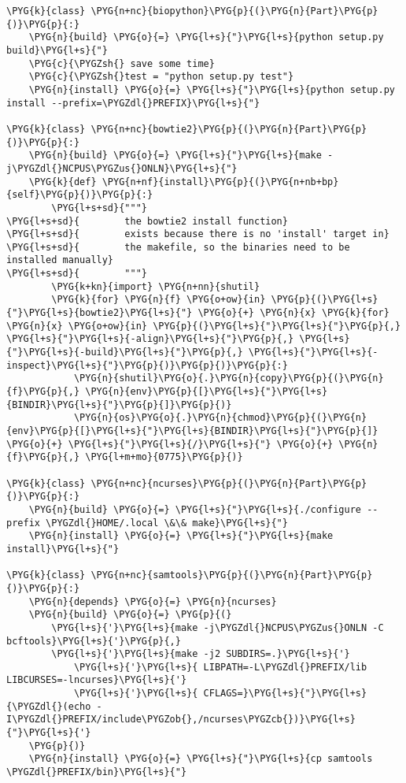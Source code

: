 \begin{Verbatim}[commandchars=\\\{\}]
\PYG{k}{class} \PYG{n+nc}{biopython}\PYG{p}{(}\PYG{n}{Part}\PYG{p}{)}\PYG{p}{:}
    \PYG{n}{build} \PYG{o}{=} \PYG{l+s}{"}\PYG{l+s}{python setup.py build}\PYG{l+s}{"}
    \PYG{c}{\PYGZsh{} save some time}
    \PYG{c}{\PYGZsh{}test = "python setup.py test"}
    \PYG{n}{install} \PYG{o}{=} \PYG{l+s}{"}\PYG{l+s}{python setup.py install --prefix=\PYGZdl{}PREFIX}\PYG{l+s}{"}

\PYG{k}{class} \PYG{n+nc}{bowtie2}\PYG{p}{(}\PYG{n}{Part}\PYG{p}{)}\PYG{p}{:}
    \PYG{n}{build} \PYG{o}{=} \PYG{l+s}{"}\PYG{l+s}{make -j\PYGZdl{}NCPUS\PYGZus{}ONLN}\PYG{l+s}{"}
    \PYG{k}{def} \PYG{n+nf}{install}\PYG{p}{(}\PYG{n+nb+bp}{self}\PYG{p}{)}\PYG{p}{:}
        \PYG{l+s+sd}{"""}
\PYG{l+s+sd}{        the bowtie2 install function}
\PYG{l+s+sd}{        exists because there is no 'install' target in}
\PYG{l+s+sd}{        the makefile, so the binaries need to be installed manually}
\PYG{l+s+sd}{        """}
        \PYG{k+kn}{import} \PYG{n+nn}{shutil}
        \PYG{k}{for} \PYG{n}{f} \PYG{o+ow}{in} \PYG{p}{(}\PYG{l+s}{"}\PYG{l+s}{bowtie2}\PYG{l+s}{"} \PYG{o}{+} \PYG{n}{x} \PYG{k}{for} \PYG{n}{x} \PYG{o+ow}{in} \PYG{p}{(}\PYG{l+s}{"}\PYG{l+s}{"}\PYG{p}{,} \PYG{l+s}{"}\PYG{l+s}{-align}\PYG{l+s}{"}\PYG{p}{,} \PYG{l+s}{"}\PYG{l+s}{-build}\PYG{l+s}{"}\PYG{p}{,} \PYG{l+s}{"}\PYG{l+s}{-inspect}\PYG{l+s}{"}\PYG{p}{)}\PYG{p}{)}\PYG{p}{:}
            \PYG{n}{shutil}\PYG{o}{.}\PYG{n}{copy}\PYG{p}{(}\PYG{n}{f}\PYG{p}{,} \PYG{n}{env}\PYG{p}{[}\PYG{l+s}{"}\PYG{l+s}{BINDIR}\PYG{l+s}{"}\PYG{p}{]}\PYG{p}{)}
            \PYG{n}{os}\PYG{o}{.}\PYG{n}{chmod}\PYG{p}{(}\PYG{n}{env}\PYG{p}{[}\PYG{l+s}{"}\PYG{l+s}{BINDIR}\PYG{l+s}{"}\PYG{p}{]} \PYG{o}{+} \PYG{l+s}{"}\PYG{l+s}{/}\PYG{l+s}{"} \PYG{o}{+} \PYG{n}{f}\PYG{p}{,} \PYG{l+m+mo}{0775}\PYG{p}{)}

\PYG{k}{class} \PYG{n+nc}{ncurses}\PYG{p}{(}\PYG{n}{Part}\PYG{p}{)}\PYG{p}{:}
    \PYG{n}{build} \PYG{o}{=} \PYG{l+s}{"}\PYG{l+s}{./configure --prefix \PYGZdl{}HOME/.local \&\& make}\PYG{l+s}{"}
    \PYG{n}{install} \PYG{o}{=} \PYG{l+s}{"}\PYG{l+s}{make install}\PYG{l+s}{"}

\PYG{k}{class} \PYG{n+nc}{samtools}\PYG{p}{(}\PYG{n}{Part}\PYG{p}{)}\PYG{p}{:}
    \PYG{n}{depends} \PYG{o}{=} \PYG{n}{ncurses}
    \PYG{n}{build} \PYG{o}{=} \PYG{p}{(}
        \PYG{l+s}{'}\PYG{l+s}{make -j\PYGZdl{}NCPUS\PYGZus{}ONLN -C bcftools}\PYG{l+s}{'}\PYG{p}{,}
        \PYG{l+s}{'}\PYG{l+s}{make -j2 SUBDIRS=.}\PYG{l+s}{'}
            \PYG{l+s}{'}\PYG{l+s}{ LIBPATH=-L\PYGZdl{}PREFIX/lib LIBCURSES=-lncurses}\PYG{l+s}{'}
            \PYG{l+s}{'}\PYG{l+s}{ CFLAGS=}\PYG{l+s}{"}\PYG{l+s}{\PYGZdl{}(echo -I\PYGZdl{}PREFIX/include\PYGZob{},/ncurses\PYGZcb{})}\PYG{l+s}{"}\PYG{l+s}{'}
    \PYG{p}{)}
    \PYG{n}{install} \PYG{o}{=} \PYG{l+s}{"}\PYG{l+s}{cp samtools \PYGZdl{}PREFIX/bin}\PYG{l+s}{"}


\end{Verbatim}

